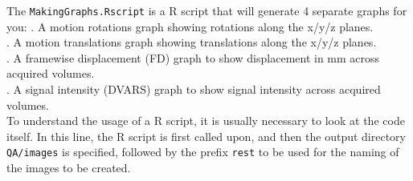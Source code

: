  The \texttt{MakingGraphs.Rscript} is a R script that will generate 4 separate graphs for you: 
	. A motion rotations graph showing rotations along the x/y/z planes.\\
	. A motion translations graph showing translations along the x/y/z planes.\\
	. A framewise displacement (FD) graph to show displacement in mm across acquired volumes.\\
	. A signal intensity (DVARS) graph to show signal intensity across acquired volumes.\\
	To understand the usage of a R script, it is usually necessary to look at the code itself. In this line, the R script is first called upon, and then the output directory \texttt{QA/images} is specified, followed by the prefix \texttt{rest} to be used for the naming of the images to be created.\\

